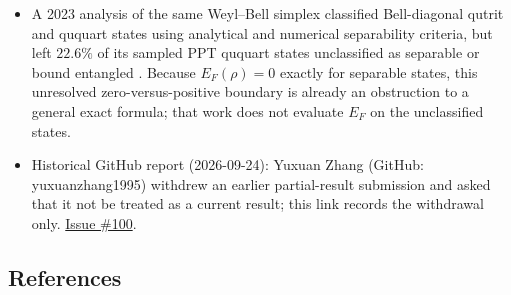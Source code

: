 \begin{itemize}
  \item A 2023 analysis of the same Weyl--Bell simplex classified Bell-diagonal
  qutrit and ququart states using analytical and numerical separability
  criteria, but left $22.6\%$ of its sampled PPT ququart states unclassified
  as separable or bound entangled
  .  Because $E_F(\rho)=0$ exactly for
  separable states, this unresolved zero-versus-positive boundary is already
  an obstruction to a general exact formula; that work does not evaluate
  $E_F$ on the unclassified states.

  \item Historical GitHub report (2026-09-24): Yuxuan Zhang (GitHub: yuxuanzhang1995) withdrew an earlier partial-result submission and asked that it not be treated as a current result; this link records the withdrawal only. \href{https://github.com/Naixu-Guo/quantum-open-problems/issues/100}{Issue \#100}.
\end{itemize}

\subsection*{References}

